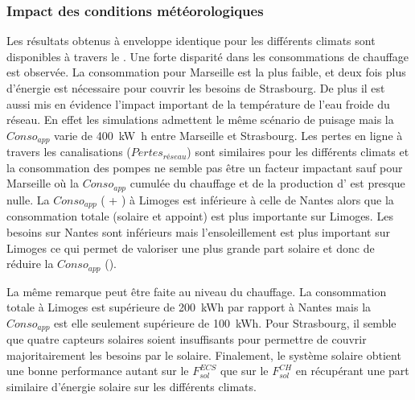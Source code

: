 \subsubsection{Impact des conditions météorologiques} %
\label{ssub:impact_des_conditions_meteorologiques}
Les résultats obtenus à enveloppe identique pour les différents climats sont disponibles à
travers le . Une forte disparité dans les consommations
de chauffage est observée. La consommation pour Marseille est la plus faible, et deux fois
plus d’énergie est nécessaire pour couvrir les besoins de Strasbourg. De plus il est aussi
mis en évidence l’impact important de la température de l’eau froide du réseau. En effet
les simulations admettent le même scénario de puisage mais la $Conso_{app}$ varie de
\SI{400}{\kilo\watt\hour} entre Marseille et Strasbourg. Les pertes en ligne à travers
les canalisations ($Pertes_{réseau}$) sont similaires pour les différents climats et la
consommation des pompes ne semble pas être un facteur impactant sauf pour Marseille où la
$Conso_{app}$ cumulée du chauffage et de la production d’ est presque nulle.
La $Conso_{app}$ ( + ) à Limoges est inférieure à celle de Nantes alors
que la consommation totale (solaire et appoint) est plus importante sur Limoges.
Les besoins sur Nantes sont inférieurs mais l’ensoleillement est plus important
sur Limoges ce qui permet de valoriser une plus grande part solaire et donc de réduire
la $Conso_{app}$ ().

La même remarque peut être faite au niveau du
chauffage. La consommation totale à Limoges est supérieure de \SI{200}{kWh} par rapport à
Nantes mais la $Conso_{app}$ est elle seulement supérieure de \SI{100}{kWh}. Pour
Strasbourg, il semble que quatre capteurs solaires soient insuffisants pour permettre
de couvrir majoritairement les besoins par le solaire. Finalement, le système solaire obtient une bonne
performance autant sur le $F_{sol}^{ECS}$ que sur le $F_{sol}^{CH}$ en récupérant une part
similaire d’énergie solaire sur les différents climats.

